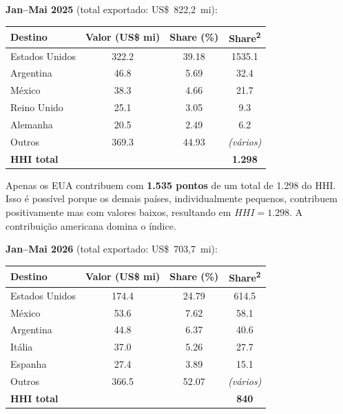 \documentclass[12pt, a4paper]{article}
\begin{document}
\begin{exemplobox}
\small
\textbf{Jan--Mai 2025} (total exportado: US\$~822,2~mi):

\medskip
\begin{center}
\renewcommand{\arraystretch}{1.25}
\begin{tabular}{lS[table-format=3.1]S[table-format=2.2]S[table-format=4.1]}
\toprule
\textbf{Destino} & \textbf{Valor (US\$ mi)} & \textbf{Share (\%)} & \textbf{Share\textsuperscript{2}} \\
\midrule
Estados Unidos &  322.2 & 39.18 & 1535.1 \\
Argentina      &   46.8 &  5.69 &   32.4 \\
México         &   38.3 &  4.66 &   21.7 \\
Reino Unido    &   25.1 &  3.05 &    9.3 \\
Alemanha       &   20.5 &  2.49 &    6.2 \\
Outros         &  369.3 & 44.93 & \textit{(vários)} \\
\midrule
\textbf{HHI total} & & & \textbf{1.298} \\
\bottomrule
\end{tabular}
\end{center}

\medskip
\noindent Apenas os EUA contribuem com \textbf{1.535 pontos} de um total de
1.298 do HHI. Isso é possível porque os demais países, individualmente
pequenos, contribuem positivamente mas com valores baixos, resultando em
$HHI = 1.298$. A contribuição americana domina o índice.

\medskip
\textbf{Jan--Mai 2026} (total exportado: US\$~703,7~mi):

\medskip
\begin{center}
\renewcommand{\arraystretch}{1.25}
\begin{tabular}{lS[table-format=3.1]S[table-format=2.2]S[table-format=3.1]}
\toprule
\textbf{Destino} & \textbf{Valor (US\$ mi)} & \textbf{Share (\%)} & \textbf{Share\textsuperscript{2}} \\
\midrule
Estados Unidos &  174.4 & 24.79 & 614.5 \\
México         &   53.6 &  7.62 &  58.1 \\
Argentina      &   44.8 &  6.37 &  40.6 \\
Itália         &   37.0 &  5.26 &  27.7 \\
Espanha        &   27.4 &  3.89 &  15.1 \\
Outros         &  366.5 & 52.07 & \textit{(vários)} \\
\midrule
\textbf{HHI total} & & & \textbf{840} \\
\bottomrule
\end{tabular}
\end{center}


\end{exemplobox}
\end{document}
